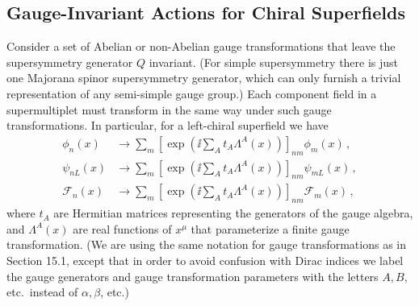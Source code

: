 
\subsection{Gauge-Invariant Actions for Chiral Superfields}

Consider a set of Abelian or non-Abelian gauge transformations that leave
the supersymmetry generator \(Q\) invariant. (For simple supersymmetry
there is just one Majorana spinor supersymmetry generator, which can only
furnish a trivial representation of any semi-simple gauge group.) Each
component field in a supermultiplet must transform in the same way under
such gauge transformations. In particular, for a left-chiral superfield we
have
\begin{equation}
  \begin{aligned}
  \phi_n(x)&\longrightarrow
    \sum_m\left[
      \exp\left(\ii\sum_A t_A\Lambda^A(x)\right)
    \right]_{nm}\phi_m(x)\,,
  \\
  \psi_{nL}(x)&\longrightarrow
    \sum_m\left[
      \exp\left(\ii\sum_A t_A\Lambda^A(x)\right)
    \right]_{nm}\psi_{mL}(x)\,,
  \\
  \mathcal{F}_n(x)&\longrightarrow
    \sum_m\left[
      \exp\left(\ii\sum_A t_A\Lambda^A(x)\right)
    \right]_{nm}\mathcal{F}_m(x)\,,
  \end{aligned}
  \tag{27.1.1}\label{eq:27.1.1}
\end{equation}
where \(t_A\) are Hermitian matrices representing the generators of the
gauge algebra, and \(\Lambda^A(x)\) are real functions of \(x^\mu\) that
parameterize a finite gauge transformation. (We are using the same notation
for gauge transformations as in Section 15.1, except that in order to avoid
confusion with Dirac indices we label the gauge generators and gauge
transformation parameters with the letters \(A,B\), etc.\ instead of
\(\alpha,\beta\), etc.)


